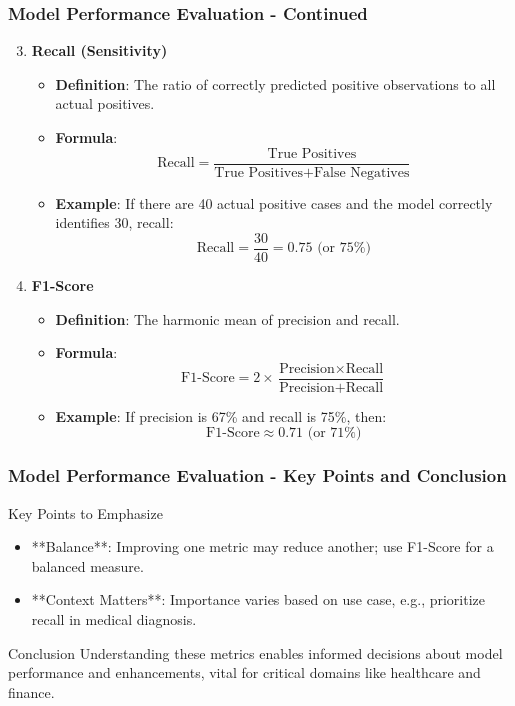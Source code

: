 \documentclass[aspectratio=169]{beamer}
\begin{document}
\begin{frame}[fragile]
    \frametitle{Model Performance Evaluation - Continued}
    \begin{enumerate}
        \setcounter{enumi}{2}
        \item \textbf{Recall (Sensitivity)}
        \begin{itemize}
            \item \textbf{Definition}: The ratio of correctly predicted positive observations to all actual positives.
            \item \textbf{Formula}:
            \[
            \text{Recall} = \frac{\text{True Positives}}{\text{True Positives} + \text{False Negatives}}
            \]
            \item \textbf{Example}: If there are 40 actual positive cases and the model correctly identifies 30, recall:
            \[
            \text{Recall} = \frac{30}{40} = 0.75 \text{ (or 75\%)}
            \]
        \end{itemize}

        \item \textbf{F1-Score}
        \begin{itemize}
            \item \textbf{Definition}: The harmonic mean of precision and recall.
            \item \textbf{Formula}:
            \[
            \text{F1-Score} = 2 \times \frac{\text{Precision} \times \text{Recall}}{\text{Precision} + \text{Recall}}
            \]
            \item \textbf{Example}: If precision is 67\% and recall is 75\%, then:
            \[
            \text{F1-Score} \approx 0.71 \text{ (or 71\%)}
            \]
        \end{itemize}
    \end{enumerate}
\end{frame}

\begin{frame}[fragile]
    \frametitle{Model Performance Evaluation - Key Points and Conclusion}
    \begin{block}{Key Points to Emphasize}
        \begin{itemize}
            \item **Balance**: Improving one metric may reduce another; use F1-Score for a balanced measure.
            \item **Context Matters**: Importance varies based on use case, e.g., prioritize recall in medical diagnosis.
        \end{itemize}
    \end{block}

    \begin{block}{Conclusion}
        Understanding these metrics enables informed decisions about model performance and enhancements, vital for critical domains like healthcare and finance.
    \end{block}
\end{frame}
\end{document}
